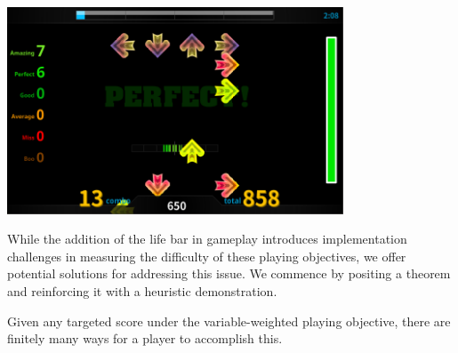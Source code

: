 \begin{center}
\includegraphics[width=10cm]{figures/images/gameplay.png}
\label{fig:gameplay}
\end{center}

While the addition of the life bar in gameplay introduces implementation challenges in measuring the difficulty of these playing objectives, we offer potential solutions for addressing this issue. We commence by positing a theorem and reinforcing it with a heuristic demonstration.

\begin{theorem}
\label{thm:finiteness}
Given any targeted score under the variable-weighted playing objective, there are finitely many ways for a player to accomplish this. 
\end{theorem}

